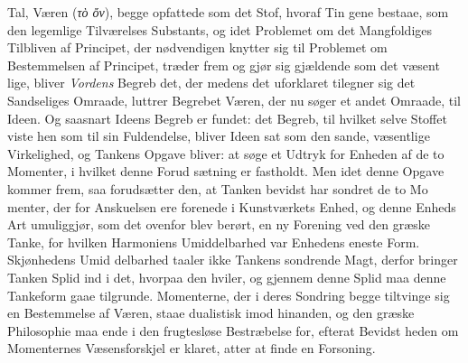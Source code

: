 \documentclass[12pt,a4paper]{book}
\newcommand{\gk}[1]{\textit{#1}}
\begin{document}
Tal, Væren (\gk{τὸ ὄν}), begge opfattede som det Stof, hvoraf Tin\-%
gene bestaae, som den legemlige Tilværelses Substants, og idet
Problemet om det Mangfoldiges Tilbliven af Principet, der
nødvendigen knytter sig til Problemet om Bestemmelsen af
Principet, træder frem og gjør sig gjældende som det væsent\-%
lige, bliver \emph{Vordens} Begreb det, der medens det uforklaret
tilegner sig det Sandseliges Omraade, luttrer Begrebet Væren,
der nu søger et andet Omraade, til Ideen. Og saasnart Ideens
Begreb er fundet: det Begreb, til hvilket selve Stoffet viste
hen som til sin Fuldendelse, bliver Ideen sat som den sande,
væsentlige Virkelighed, og Tankens Opgave bliver: at søge et
Udtryk for Enheden af de to Momenter, i hvilket denne Forud\-%
sætning er fastholdt. Men idet denne Opgave kommer frem,
saa forudsætter den, at Tanken bevidst har sondret de to Mo\-%
menter, der for Anskuelsen ere forenede i Kunstværkets Enhed,
og denne Enheds Art umuliggjør, som det ovenfor blev berørt,
en ny Forening ved den græske Tanke, for hvilken Harmoniens
Umiddelbarhed var Enhedens eneste Form. Skjønhedens Umid\-%
delbarhed taaler ikke Tankens sondrende Magt, derfor bringer
Tanken Splid ind i det, hvorpaa den hviler, og gjennem denne
Splid maa denne Tankeform gaae tilgrunde. Momenterne, der
i deres Sondring begge tiltvinge sig en Bestemmelse af Væren,
staae dualistisk imod hinanden, og den græske Philosophie
maa ende i den frugtesløse Bestræbelse for, efterat Bevidst\-%
heden om Momenternes Væsensforskjel er klaret, atter at finde
en Forsoning.
\end{document}
